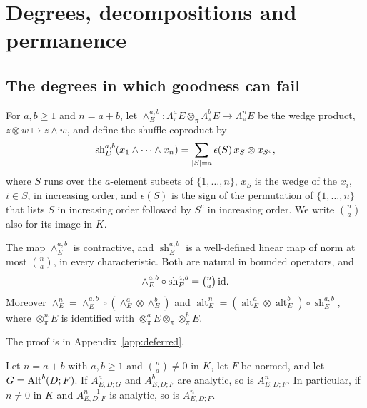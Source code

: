 \section{Degrees, decompositions and permanence}\label{sec:combining}

\subsection{The degrees in which goodness can fail}\label{cmb:ssec:degrees}
For $a,b\ge1$ and $n=a+b$, let $\wedge^{a,b}_E\colon\Lambda^a_\pi E\otimes_\pi\Lambda^b_\pi E\to\Lambda^n_\pi E$ be the
wedge product, $z\otimes w\mapsto z\wedge w$, and define the shuffle coproduct by
\begin{equation}\label{fib:eq:shuffle}
 \operatorname{sh}^{a,b}_E(x_1\wedge\dots\wedge x_n)=\sum_{\lvert S\rvert=a}\epsilon(S)\,x_S\otimes x_{S^c},
\end{equation}
where $S$ runs over the $a$\nobreakdash-element subsets of $\{1,\dots,n\}$, $x_S$ is the wedge of the $x_i$, $i\in S$, in
increasing order, and $\epsilon(S)$ is the sign of the permutation of $\{1,\dots,n\}$ that lists $S$ in increasing order
followed by $S^c$ in increasing order. We write $\binom na$ also for its image in $K$.

\begin{lemma}\label{fib:lem:hopf}
The map $\wedge^{a,b}_E$ is contractive, and $\operatorname{sh}^{a,b}_E$ is a well-defined linear map of norm at most
$\binom na$, in every characteristic. Both are natural in bounded operators, and
\begin{equation}\label{fib:eq:hopf}
 \wedge^{a,b}_E\circ\operatorname{sh}^{a,b}_E=\tbinom na\,\mathrm{id}.
\end{equation}
Moreover $\wedge^n_E=\wedge^{a,b}_E\circ(\wedge^a_E\otimes\wedge^b_E)$ and
$\operatorname{alt}^n_E=(\operatorname{alt}^a_E\otimes\operatorname{alt}^b_E)\circ\operatorname{sh}^{a,b}_E$, where
$\otimes^n_\pi E$ is identified with $\otimes^a_\pi E\otimes_\pi\otimes^b_\pi E$.
\end{lemma}

The proof is in Appendix~\ref{app:deferred}.

\begin{theorem}\label{fib:thm:lucas}
Let $n=a+b$ with $a,b\ge1$ and $\binom na\ne0$ in $K$, let $F$ be normed, and let $G=\operatorname{Alt}^b(D;F)$. If
$A^a_{E,D;G}$ and $A^b_{E,D;F}$ are analytic, so is $A^n_{E,D;F}$. In particular, if $n\ne0$ in $K$ and
$A^{n-1}_{E,D;F}$ is analytic, so is $A^n_{E,D;F}$.
\end{theorem}

